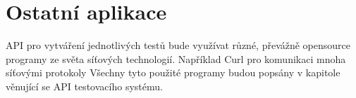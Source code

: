\section{Ostatní aplikace}
API pro vytváření jednotlivých testů bude využívat různé, převážně opensource programy ze světa síťových technologií. Například Curl pro komunikaci mnoha síťovými protokoly Všechny tyto použité programy budou popsány v kapitole věnující se API testovacího systému.

\endinput
